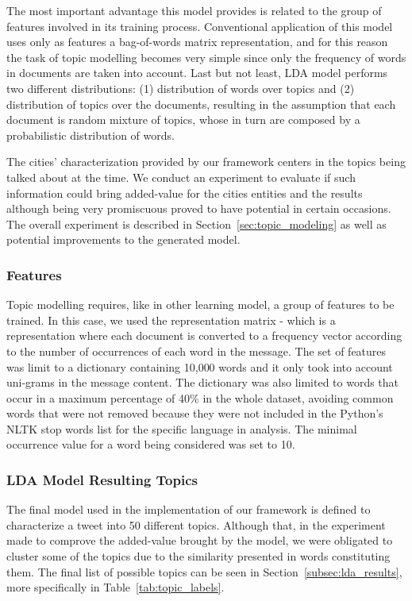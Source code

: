 The most important advantage this model provides is related to the group of features involved in its training process. Conventional application of this model uses only as features a bag-of-words matrix representation, and for this reason the task of topic modelling becomes very simple since only the frequency of words in documents are taken into account. Last but not least, \gls{LDA} model performs two different distributions: (1) distribution of words over topics and (2) distribution of topics over the documents, resulting in the assumption that each document is random mixture of topics, whose in turn are composed by a probabilistic distribution of words.

The cities' characterization provided by our framework centers in the topics being talked about at the time. We conduct an experiment to evaluate if such information could bring added-value for the cities entities and the results although being very promiscuous proved to have potential in certain occasions. The overall experiment is described in Section~\ref{sec:topic_modeling} as well as potential improvements to the generated model.

\subsubsection{Features}
Topic modelling requires, like in other learning model, a group of features to be trained. In this case, we used the  representation matrix - which is a representation where each document is converted to a frequency vector according to the number of occurrences of each word in the message. The set of features was limit to a dictionary containing 10,000 words and it only took into account uni-grams in the message content. The dictionary was also limited to words that occur in a maximum percentage of 40$\%$ in the whole dataset, avoiding common words that were not removed because they were not included in the Python's \gls{NLTK} stop words list for the specific language in analysis. The minimal occurrence value for a word being considered was set to 10.

\subsubsection{LDA Model Resulting Topics}
The final model used in the implementation of our framework is defined to characterize a tweet into 50 different topics. Although that, in the experiment made to comprove the added-value brought by the model,  we were obligated to cluster some of the topics due to the similarity presented in words constituting them. The final list of possible topics can be seen in Section~\ref{subsec:lda_results}, more specifically in Table~\ref{tab:topic_labels}.

